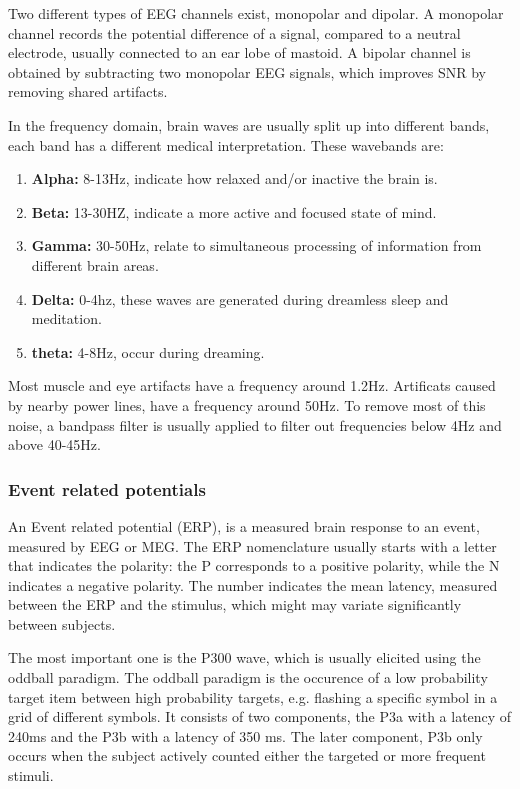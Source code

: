 
Two different types of EEG channels exist, monopolar and dipolar. A monopolar channel records the potential difference of a signal, compared to a neutral electrode, usually connected to an ear lobe of mastoid. A bipolar channel is obtained by subtracting two monopolar EEG signals, which improves SNR by removing shared artifacts\cite{MonoBiPolar}. 

In the frequency domain, brain waves are usually split up into different bands\cite{EmotionRelativePower,WavesSite}, each band has a different medical interpretation. These wavebands \label{wavebands} are:
\begin{enumerate}
\item \textbf{Alpha:} 8-13Hz, indicate how relaxed and/or inactive the brain is.
\item \textbf{Beta:} 13-30HZ, indicate a more active and focused state of mind.
\item \textbf{Gamma:} 30-50Hz, relate to simultaneous processing of information from different brain areas.
\item \textbf{Delta:} 0-4hz, these waves are generated during dreamless sleep and meditation.
\item \textbf{theta:} 4-8Hz, occur during dreaming.
\end{enumerate}
Most muscle and eye artifacts have a frequency around 1.2Hz. Artificats caused by nearby power lines, have a frequency around 50Hz\cite{ExtendedPaper}. To remove most of this noise, a bandpass filter is usually applied to filter out frequencies below 4Hz and above 40-45Hz.

\subsubsection{Event related potentials}

An Event related potential (ERP), is a measured brain response to an event, measured by EEG or MEG. The ERP nomenclature usually starts with a letter that indicates the polarity: the P corresponds to a positive polarity, while the N indicates a negative polarity. The number indicates the mean latency, measured between the ERP and the stimulus, which might may variate significantly between subjects.

\npar

The most important one is the P300 wave, which is usually elicited using the oddball paradigm. The oddball paradigm is the occurence of a low probability target item between high probability targets, e.g. flashing a specific symbol in a grid of different symbols. It consists of two components, the P3a with a latency of 240ms and the P3b with a latency of 350 ms\cite{P300TwoParts}. The later component, P3b only occurs when the subject actively counted either the targeted or more frequent stimuli.

